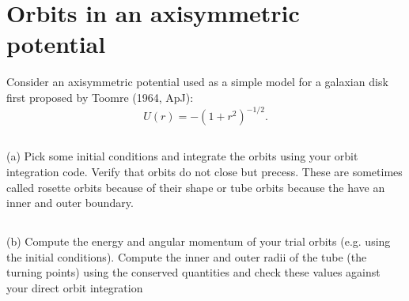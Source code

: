 \section{Orbits in an axisymmetric potential}
Consider an axisymmetric potential used as a simple model for a galaxian disk first proposed by Toomre (1964, ApJ):
\begin{equation}
    U(r) = -(1+r^2)^{-1/2}.
\end{equation}

\subsection{}
(a) Pick some initial conditions and integrate the orbits using your
orbit integration code. Verify that orbits do not close but precess.
These are sometimes called rosette orbits because of their shape
or tube orbits because the have an inner and outer boundary.

\subsection{}
(b) Compute the energy and angular momentum of your trial orbits
(e.g. using the initial conditions). Compute the inner and outer
radii of the tube (the turning points) using the conserved quantities
and check these values against your direct orbit integration
